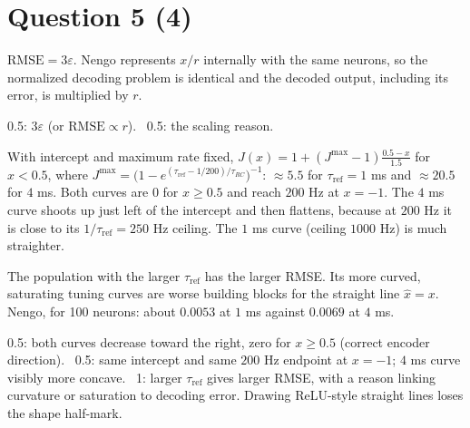 \documentclass[11pt,letterpaper]{article}
\newcommand{\tref}{\tau_{\mathrm{ref}}}
\newcommand{\trc}{\tau_{RC}}
\newcommand{\ans}[1]{\par\vspace{4pt}{\bfseries #1}\quad}
\begin{document}
\section*{Question 5 \hfill (4)}

\ans{(a) [1]}
$\mathrm{RMSE} = 3\varepsilon$. Nengo represents $x/r$ internally with the same neurons, so the normalized decoding problem is identical and the decoded output, including its error, is multiplied by $r$.
\begin{marking}
0.5: $3\varepsilon$ (or $\mathrm{RMSE} \propto r$). \ 0.5: the scaling reason.
\end{marking}

\ans{(b) [2]}
With intercept and maximum rate fixed, $J(x) = 1 + (J^{\max} - 1)\frac{0.5 - x}{1.5}$ for $x < 0.5$, where $J^{\max} = \bigl(1 - e^{(\tref - 1/200)/\trc}\bigr)^{-1}$: $\approx 5.5$ for $\tref = 1$ ms and $\approx 20.5$ for $4$ ms. Both curves are $0$ for $x \ge 0.5$ and reach $200$ Hz at $x = -1$. The $4$ ms curve shoots up just left of the intercept and then flattens, because at $200$ Hz it is close to its $1/\tref = 250$ Hz ceiling. The $1$ ms curve (ceiling $1000$ Hz) is much straighter.
\begin{center}
\end{center}
The population with the larger $\tref$ has the larger RMSE. Its more curved, saturating tuning curves are worse building blocks for the straight line $\hat x = x$. Nengo, for 100 neurons: about $0.0053$ at $1$ ms against $0.0069$ at $4$ ms.
\begin{marking}
0.5: both curves decrease toward the right, zero for $x \ge 0.5$ (correct encoder direction). \ 0.5: same intercept and same $200$ Hz endpoint at $x = -1$; $4$ ms curve visibly more concave. \ 1: larger $\tref$ gives larger RMSE, with a reason linking curvature or saturation to decoding error. Drawing ReLU-style straight lines loses the shape half-mark.
\end{marking}
\end{document}

